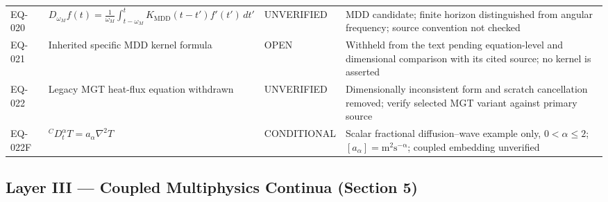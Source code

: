 \begin{table}[htbp]
\begin{tabularx}{\textwidth}{@{}p{1.6cm}Y p{2.8cm}Y@{}}
EQ-020 & $D_{\omega_M} f(t) = \tfrac{1}{\omega_M}\int_{t-\omega_M}^{t}K_{\mathrm{MDD}}(t-t')f'(t')\,dt'$ & UNVERIFIED & MDD candidate; finite horizon distinguished from angular frequency; source convention not checked \\
EQ-021 & Inherited specific MDD kernel formula & OPEN & Withheld from the text pending equation-level and dimensional comparison with its cited source; no kernel is asserted \\
EQ-022 & Legacy MGT heat-flux equation withdrawn & UNVERIFIED & Dimensionally inconsistent form and scratch cancellation removed; verify selected MGT variant against primary source \\
EQ-022F & ${}^C D_t^\alpha T = a_\alpha\nabla^2T$ & CONDITIONAL & Scalar fractional diffusion--wave example only, $0<\alpha\leq2$; $[a_\alpha]=\mathrm{m^2s^{-\alpha}}$; coupled embedding unverified \\
\bottomrule
\end{tabularx}
\end{table}

\subsection{Layer III — Coupled Multiphysics Continua (Section 5)}

